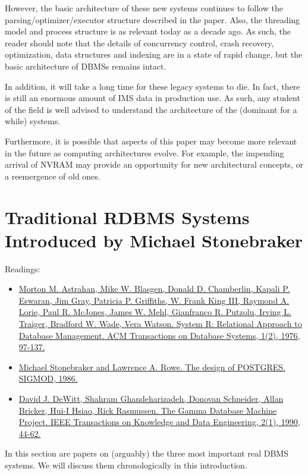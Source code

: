 \documentclass[b5paper,11pt,twoside,openright]{book}
\newcommand\Chapter[3]{
  \hypertarget{#1}{
    \chapter[#2]{#2\\{\Large #3}}
  }
}
\begin{document}
However, the basic architecture of these new systems continues to follow
the parsing/optimizer/executor structure described in the paper. Also,
the threading model and process structure is as relevant today as a
decade ago. As such, the reader should note that the details of
concurrency control, crash recovery, optimization, data structures and
indexing are in a state of rapid change, but the basic architecture of
DBMSs remains intact.

In addition, it will take a long time for these legacy systems to die.
In fact, there is still an enormous amount of IMS data in production
use. As such, any student of the field is well advised to understand the
architecture of the (dominant for a while) systems.

Furthermore, it is possible that aspects of this paper may become more
relevant in the future as computing architectures evolve. For example,
the impending arrival of NVRAM may provide an opportunity for new
architectural concepts, or a reemergence of old ones.


\Chapter{ch2-importantdbms}{Traditional RDBMS Systems}{%
Introduced by Michael Stonebraker
}

\begin{framed}
Readings:

\begin{itemize}
\item
\href{https://scholar.google.com/scholar?cluster=15466550502837111601}{Morton
  M. Astrahan, Mike W. Blasgen, Donald D. Chamberlin, Kapali P. Eswaran,
  Jim Gray, Patricia P. Griffiths, W. Frank King III, Raymond A. Lorie,
  Paul R. McJones, James W. Mehl, Gianfranco R. Putzolu, Irving L.
  Traiger, Bradford W. Wade, Vera Watson. {System R: Relational Approach
    to Database Management}. {ACM Transactions on Database Systems}, 1(2),
  1976, 97-137.}
\item
\href{https://scholar.google.com/scholar?cluster=7945977557090027847}{Michael
  Stonebraker and Lawrence A. Rowe. {The design of POSTGRES}. {SIGMOD},
  1986.}
\item
\href{https://scholar.google.com/scholar?cluster=8912521541627865753}{David
  J. DeWitt, Shahram Ghandeharizadeh, Donovan Schneider, Allan Bricker,
  Hui-I Hsiao, Rick Rasmussen. {The Gamma Database Machine Project}. {IEEE
    Transactions on Knowledge and Data Engineering}, 2(1), 1990, 44-62.}
\end{itemize}
\end{framed}

In this section are papers on (arguably) the three most important real
DBMS systems. We will discuss them chronologically in this introduction.
\end{document}
